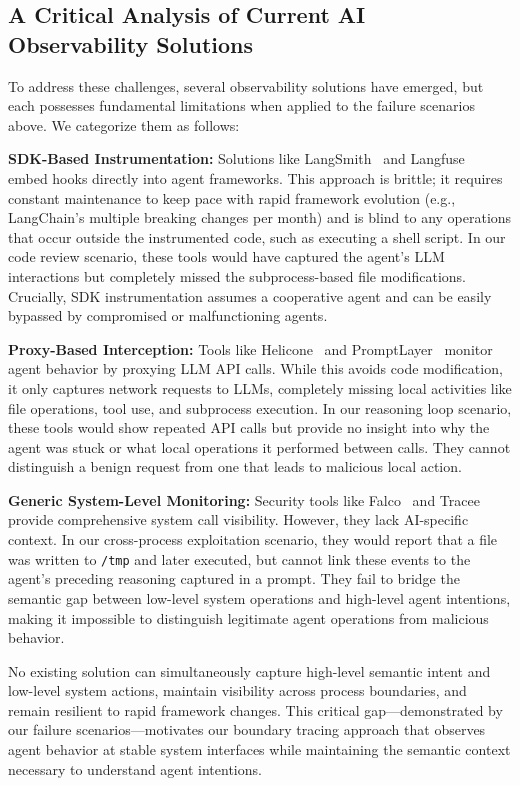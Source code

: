 \subsection{A Critical Analysis of Current AI Observability Solutions}

To address these challenges, several observability solutions have emerged, but each possesses fundamental limitations when applied to the failure scenarios above. We categorize them as follows:

\textbf{SDK-Based Instrumentation:} Solutions like LangSmith~\cite{langsmith} and Langfuse~\cite{langfuse} embed hooks directly into agent frameworks. This approach is brittle; it requires constant maintenance to keep pace with rapid framework evolution (e.g., LangChain's multiple breaking changes per month) and is blind to any operations that occur outside the instrumented code, such as executing a shell script. In our code review scenario, these tools would have captured the agent's LLM interactions but completely missed the subprocess-based file modifications. Crucially, SDK instrumentation assumes a cooperative agent and can be easily bypassed by compromised or malfunctioning agents.

\textbf{Proxy-Based Interception:} Tools like Helicone~\cite{helicone} and PromptLayer~\cite{promptlayer} monitor agent behavior by proxying LLM API calls. While this avoids code modification, it only captures network requests to LLMs, completely missing local activities like file operations, tool use, and subprocess execution. In our reasoning loop scenario, these tools would show repeated API calls but provide no insight into why the agent was stuck or what local operations it performed between calls. They cannot distinguish a benign request from one that leads to malicious local action.

\textbf{Generic System-Level Monitoring:} Security tools like Falco~\cite{falco} and Tracee~\cite{tracee} provide comprehensive system call visibility. However, they lack AI-specific context. In our cross-process exploitation scenario, they would report that a file was written to \texttt{/tmp} and later executed, but cannot link these events to the agent's preceding reasoning captured in a prompt. They fail to bridge the semantic gap between low-level system operations and high-level agent intentions, making it impossible to distinguish legitimate agent operations from malicious behavior.

No existing solution can simultaneously capture high-level semantic intent and low-level system actions, maintain visibility across process boundaries, and remain resilient to rapid framework changes. This critical gap—demonstrated by our failure scenarios—motivates our boundary tracing approach that observes agent behavior at stable system interfaces while maintaining the semantic context necessary to understand agent intentions.